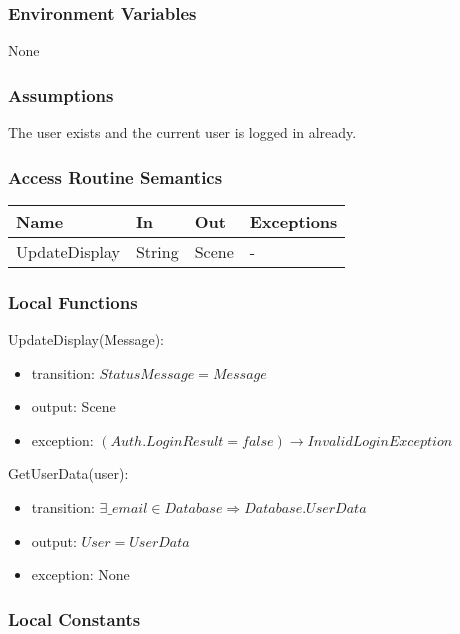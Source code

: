 \documentclass[12pt, titlepage]{article}
\begin{document}
\subsubsection{Environment Variables}

None

\subsubsection{Assumptions}

The user exists and the current user is logged in already.

\subsubsection{Access Routine Semantics}

\begin{center}
	\begin{tabular}{p{4cm} p{2cm} p{4cm} p{4cm}}
	\hline
	\textbf{Name} & \textbf{In} & \textbf{Out} & \textbf{Exceptions} \\
	\hline
	UpdateDisplay & String & Scene & - \\
	\hline
	\end{tabular}
\end{center}

\subsubsection{Local Functions}

\noindent UpdateDisplay(Message):
\begin{itemize}
\item transition: $StatusMessage = Message$ 
\item output: Scene
\item exception: $(Auth.LoginResult = false) \rightarrow InvalidLoginException$
\end{itemize}

\noindent GetUserData(user):
\begin{itemize}
\item transition: $\exists \_email \in Database \Rightarrow Database.UserData$
\item output: $User = UserData$
\item exception: None
\end{itemize}

\subsubsection{Local Constants}
\end{document}
